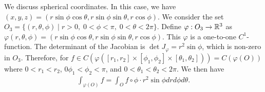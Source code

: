 \begin{example}
    We discuss spherical coordinates. In this case, we have $(x,y,z) = (r\sin\phi \cos \theta, r \sin \phi \sin \theta, r \cos \phi)$. We consider the set $O_{3} = \{(r,\theta,\phi) \mid r > 0,\; 0 < \phi < \pi,\;0 < \theta < 2\pi\}$. Define $\varphi:O_{3} \to \mathbb{R}^{3}$ as $\varphi(r,\theta,\phi) = (r\sin\phi \cos \theta, r \sin \phi \sin \theta, r \cos \phi)$. This $\varphi$ is a one-to-one $C^{1}$-function. The determinant of the Jacobian is $\det J_{\varphi} = r^{2} \sin \phi$, which is non-zero in $O_{3}$. Therefore, for $f \in C(\varphi([r_{1},r_{2}] \times [\phi_{1},\phi_{2}] \times [\theta_{1},\theta_{2}])) = C(\varphi(O))$ where $0 < r_{1} < r_{2}$, $0 \phi_{1} < \phi_{2} < \pi$, and $0 < \theta_{1} < \theta_{2} < 2\pi$. We then have
    \begin{align}
        \int_{\varphi(O)} f = \int_{O} f \circ \phi \cdot r^{2} \sin \phi dr d\phi d\theta.
    \end{align}
\end{example}